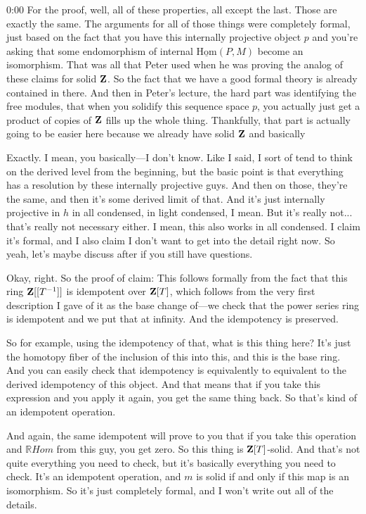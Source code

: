 \begin{unfinished}{0:00}
For the proof, well, all of these properties, all except the last. Those are exactly the same. The arguments for all of those things were completely formal, just based on the fact that you have this internally projective object $p$ and you're asking that some endomorphism of internal $\underline{\text{Hom}}(P,M)$ become an isomorphism. That was all that Peter used when he was proving the analog of these claims for solid $\mathbf Z$. So the fact that we have a good formal theory is already contained in there. And then in Peter's lecture, the hard part was identifying the free modules, that when you solidify this sequence space $p$, you actually just get a product of copies of $\mathbf Z$ fills up the whole thing. Thankfully, that part is actually going to be easier here because we already have solid $\mathbf Z$ and basically

Exactly. I mean, you basically---I don't know. Like I said, I sort of tend to think on the derived level from the beginning, but the basic point is that everything has a resolution by these internally projective guys. And then on those, they're the same, and then it's some derived limit of that. And it's just internally projective in $h$ in all condensed, in light condensed, I mean. But it's really not... that's really not necessary either. I mean, this also works in all condensed. I claim it's formal, and I also claim I don't want to get into the detail right now. So yeah, let's maybe discuss after if you still have questions.

Okay, right. So the proof of claim: This follows formally from the fact that this ring $\mathbf Z[[T^{-1}]]$ is idempotent over $\mathbf Z[T]$, which follows from the very first description I gave of it as the base change of---we check that the power series ring is idempotent and we put that at infinity. And the idempotency is preserved.

So for example, using the idempotency of that, what is this thing here? It's just the homotopy fiber of the inclusion of this into this, and this is the base ring. And you can easily check that idempotency is equivalently to equivalent to the derived idempotency of this object. And that means that if you take this expression and you apply it again, you get the same thing back. So that's kind of an idempotent operation.

And again, the same idempotent will prove to you that if you take this operation and $\mathbb{R}Hom$ from this guy, you get zero. So this thing is $\mathbf Z[T]$-solid. And that's not quite everything you need to check, but it's basically everything you need to check. It's an idempotent operation, and $m$ is solid if and only if this map is an isomorphism. So it's just completely formal, and I won't write out all of the details.


\end{unfinished}
